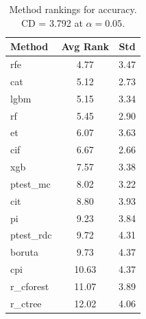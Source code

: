 \begin{table}[h]
\centering
\caption{Method rankings for accuracy. CD = 3.792 at $\alpha=0.05$.}
\label{tab:ranks_accuracy}
\begin{tabular}{lcc}
\toprule
Method & Avg Rank & Std \\
\midrule
rfe & 4.77 & 3.47 \\
cat & 5.12 & 2.73 \\
lgbm & 5.15 & 3.34 \\
rf & 5.45 & 2.90 \\
et & 6.07 & 3.63 \\
cif & 6.67 & 2.66 \\
xgb & 7.57 & 3.38 \\
ptest_mc & 8.02 & 3.22 \\
cit & 8.80 & 3.93 \\
pi & 9.23 & 3.84 \\
ptest_rdc & 9.72 & 4.31 \\
boruta & 9.73 & 4.37 \\
cpi & 10.63 & 4.37 \\
r_cforest & 11.07 & 3.89 \\
r_ctree & 12.02 & 4.06 \\
\bottomrule
\end{tabular}
\end{table}